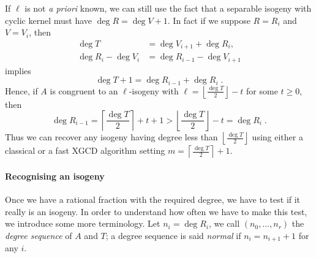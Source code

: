 If $\ell$ is not \emph{a priori} known, we can still use the fact that
a separable isogeny with cyclic kernel must have $\deg R = \deg V +
1$. In fact if we suppose $R = R_i$ and $V = V_i$, then
\begin{align*}
  \deg T &= \deg V_{i+1} + \deg R_i,\\
  \deg R_i - \deg V_i &= \deg R_{i-1} - \deg V_{i+1}
\end{align*}
implies
\begin{equation*}
  \deg T + 1 = \deg R_{i-1} + \deg R_i  
  \;\text{.}
\end{equation*}
Hence, if $A$ is congruent to an $\ell$-isogeny with $\ell =
\left\lfloor\frac{\deg T}{2}\right\rfloor - t$ for some $t\ge0$, then
\begin{equation}
  \label{eq:degseq}
  \deg R_{i-1} =
  \left\lceil\frac{\deg T}{2}\right\rceil + t + 1 >
  \left\lfloor\frac{\deg T}{2}\right\rfloor - t = \deg R_i
  \;\text{.}
\end{equation}
Thus we can recover any isogeny having degree less than
$\left\lfloor\frac{\deg T}{2}\right\rfloor$ using either a classical
or a fast XGCD algorithm setting $m = \left\lceil\frac{\deg
    T}{2}\right\rceil + 1$.


\paragraph{Recognising an isogeny}
Once we have a rational fraction with the required degree, we have to
test if it really is an isogeny. In order to understand how often we
have to make this test, we introduce some more terminology. Let $n_i =
\deg R_i$, we call $(n_0,\ldots,n_r)$ the \emph{degree sequence} of
$A$ and $T$; a degree sequence is said \emph{normal} if $n_i = n_{i+1}
+ 1$ for any $i$.

